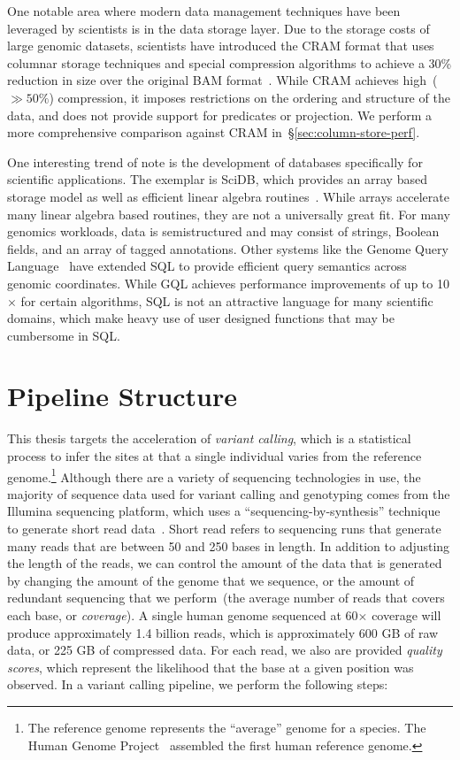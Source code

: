 \documentclass[masters]{ucbthesis}
\begin{document}
One notable area where modern data management techniques have been leveraged by scientists is in
the data storage layer. Due to the storage costs of large genomic datasets, scientists have introduced the
CRAM format that uses columnar storage techniques and special compression algorithms to achieve a
30\% reduction in size over the original BAM format~\cite{fritz11}. While CRAM achieves high~($\gg
50\%$) compression, it imposes restrictions on the ordering and structure of the data, and does not
provide support for predicates or projection. We perform a more comprehensive comparison against
CRAM in~\S\ref{sec:column-store-perf}.

One interesting trend of note is the development of databases specifically for scientific applications.
The exemplar is SciDB, which provides an array based storage model as well as efficient
linear algebra routines~\cite{brown10}. While arrays accelerate many linear algebra based routines, they
are not a universally great fit. For many genomics workloads, data is semistructured and may consist of
strings, Boolean fields, and an array of tagged annotations. Other systems like the Genome Query
Language~\cite{kozanitis14} have extended SQL to provide efficient query semantics across genomic
coordinates. While GQL achieves performance improvements of up to 10$\times$ for certain algorithms,
SQL is not an attractive language for many scientific domains, which make heavy use of user designed
functions that may be cumbersome in SQL.

\section{Pipeline Structure}
\label{sec:genomics-pipeline}

This thesis targets the acceleration of \emph{variant calling}, which is a statistical process to infer the
sites at that a single individual varies from the reference genome.\footnote{The reference genome
represents the ``average'' genome for a species. The Human Genome Project~\cite{lander01} assembled
the first human reference genome.} Although there are a variety of sequencing technologies in use, the
majority of sequence data used for variant calling and genotyping comes from the Illumina sequencing
platform, which uses a ``sequencing-by-synthesis'' technique to generate short read
data~\cite{metzker09}. Short read refers to 
sequencing runs that generate many reads that are between 50 and 250 bases in length. In addition to
adjusting the length of the reads, we can control the amount of the data that is generated by
changing the amount of the genome that we sequence, or the amount of redundant sequencing that
we perform~(the average number of reads that covers each base, or \emph{coverage}). A single
human genome sequenced at 60$\times$ coverage will produce approximately 1.4 billion reads,
which is approximately 600 GB of raw data, or 225 GB of compressed data. For each read, we also
are provided \emph{quality scores}, which represent the likelihood that the base at a given position
was observed. In a variant calling pipeline, we perform the following steps:
\end{document}

